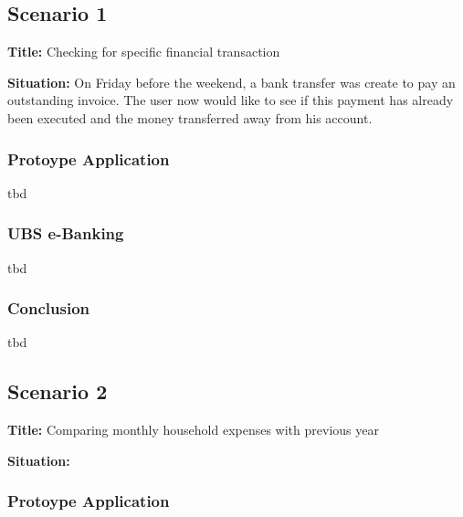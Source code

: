 \subsection{Scenario 1}

\textbf{Title:} Checking for specific financial transaction

\textbf{Situation:} On Friday before the weekend, a bank transfer was create to pay an outstanding invoice. The user now would like to see if this payment has already been executed and the money transferred away from his account.


\subsubsection{Protoype Application}

tbd



\subsubsection{UBS e-Banking}

tbd


\subsubsection{Conclusion}

tbd



\subsection{Scenario 2}

\textbf{Title:} Comparing monthly household expenses with previous year

\textbf{Situation:}


\subsubsection{Protoype Application}

